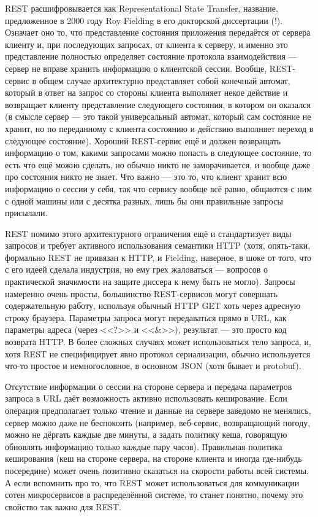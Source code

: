 \documentclass[a5paper]{article}
\begin{document}
REST расшифровывается как Representational State Transfer, название, предложенное в 2000 году Roy Fielding в его докторской диссертации (!). Означает оно то, что представление состояния приложения передаётся от сервера клиенту и, при последующих запросах, от клиента к серверу, и именно это представление полностью определяет состояние протокола взаимодействия --- сервер не вправе хранить информацию о клиентской сессии. Вообще, REST-сервис в общем случае архитектурно представляет собой конечный автомат, который в ответ на запрос со стороны клиента выполняет некое действие и возвращает клиенту представление следующего состояния, в котором он оказался (в смысле сервер --- это такой универсальный автомат, который сам состояние не хранит, но по переданному с клиента состоянию и действию выполняет переход в следующее состояние). Хороший REST-сервис ещё и должен возвращать информацию о том, какими запросами можно попасть в следующее состояние, то есть что ещё можно сделать, но обычно никто не заморачивается, и вообще даже про состояния никто не знает. Что важно --- это то, что клиент хранит всю информацию о сессии у себя, так что сервису вообще всё равно, общаются с ним с одной машины или с десятка разных, лишь бы они правильные запросы присылали.

REST помимо этого архитектурного ограничения ещё и стандартизует виды запросов и требует активного использования семантики HTTP (хотя, опять-таки, формально REST не привязан к HTTP, и Fielding, наверное, в шоке от того, что с его идеей сделала индустрия, но ему грех жаловаться --- вопросов о практической значимости на защите диссера к нему быть не могло). Запросы намеренно очень просты, большинство REST-сервисов могут совершать содержательную работу, используя обычный HTTP GET хоть через адресную строку браузера. Параметры запроса могут передаваться прямо в URL, как параметры адреса (через <<?>> и <<\&>>), результат --- это просто код возврата HTTP. В более сложных случаях может использоваться тело запроса, и, хотя REST не специфицирует явно протокол сериализации, обычно используется что-то простое и немногословное, в основном JSON (хотя бывает и protobuf).

Отсутствие информации о сессии на стороне сервера и передача параметров запроса в URL даёт возможность активно использовать кеширование. Если операция предполагает только чтение и данные на сервере заведомо не менялись, сервер можно даже не беспокоить (например, веб-сервис, возвращающий погоду, можно не дёргать каждые две минуты, а задать политику кеша, говорящую обновлять информацию только каждые пару часов). Правильная политика кеширования (кеш на стороне сервера, на стороне клиента и иногда где-нибудь посередине) может очень позитивно сказаться на скорости работы всей системы. А если вспомнить про то, что REST может использоваться для коммуникации сотен микросервисов в распределённой системе, то станет понятно, почему это свойство так важно для REST.
\end{document}
